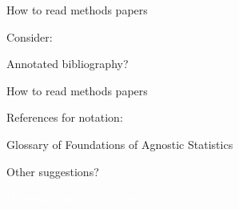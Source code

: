 \documentclass[xcolor={dvipsnames}, handout]{beamer}
\begin{document}
\begin{frame}{How to read methods papers}

Consider:\pause
\begin{wideitemize}
\item Annotated bibliography?
\end{wideitemize}

\end{frame}



\begin{frame}{How to read methods papers}

References for notation:\pause
\begin{wideitemize}
\item \cite{hastie2009elements}
\item Glossary of \cite{aronow2019foundations} Foundations of Agnostic Statistics
\item Other suggestions?
\end{wideitemize}

\end{frame}




\begin{transitionframe}
\centering

\LARGE \textcolor{white}{Potential outcomes framework.}

\end{transitionframe}
\end{document}
